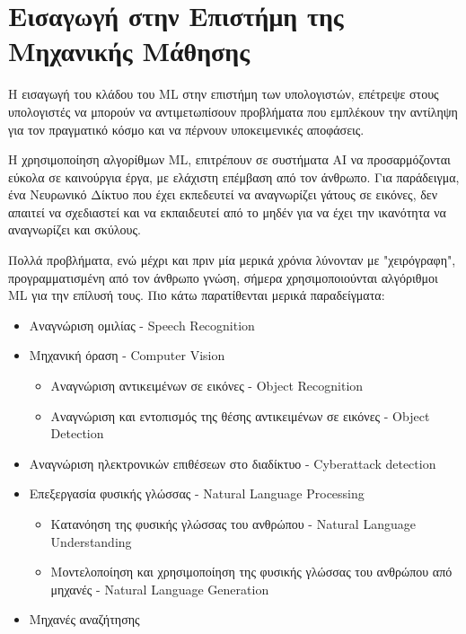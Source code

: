 \section{Εισαγωγή στην Επιστήμη της Μηχανικής Μάθησης}
\label{sec:theory_ml}

Η εισαγωγή του κλάδου του ML στην επιστήμη των υπολογιστών,
επέτρεψε στους υπολογιστές να μπορούν να αντιμετωπίσουν προβλήματα που εμπλέκουν
την αντίληψη για τον πραγματικό κόσμο και να πέρνουν υποκειμενικές αποφάσεις.

Η χρησιμοποίηση αλγορίθμων ML, επιτρέπουν σε συστήματα AI
να προσαρμόζονται εύκολα σε καινούργια έργα, με ελάχιστη επέμβαση από τον άνθρωπο.
Για παράδειγμα, ένα Νευρωνικό Δίκτυο που έχει εκπεδευτεί να αναγνωρίζει γάτους σε εικόνες,
δεν απαιτεί να σχεδιαστεί και να εκπαιδευτεί από το μηδέν για να έχει την ικανότητα
να αναγνωρίζει και σκύλους.

Πολλά προβλήματα, ενώ μέχρι και πριν μία μερικά χρόνια λύνονταν με
"χειρόγραφη", προγραμματισμένη από τον άνθρωπο γνώση, σήμερα χρησιμοποιούνται
αλγόριθμοι ML για την επίλυσή τους. Πιο κάτω παρατίθενται μερικά
παραδείγματα:
\begin{itemize}
  \item{Αναγνώριση ομιλίας - Speech Recognition}
  \item{Μηχανική όραση - Computer Vision}
  \begin{itemize}
    \item{Αναγνώριση αντικειμένων σε εικόνες - Object Recognition}
    \item{Αναγνώριση και εντοπισμός της θέσης αντικειμένων σε εικόνες - Object Detection}
  \end{itemize}
  \item{Αναγνώριση ηλεκτρονικών επιθέσεων στο διαδίκτυο - Cyberattack detection}
  \item{Επεξεργασία φυσικής γλώσσας - Natural Language Processing}
  \begin{itemize}
    \item{Κατανόηση της φυσικής γλώσσας του ανθρώπου - Natural Language Understanding}
    \item{Μοντελοποίηση και χρησιμοποίηση της φυσικής γλώσσας του ανθρώπου από μηχανές - Natural Language Generation}
  \end{itemize}
  \item{Μηχανές αναζήτησης}
\end{itemize}

